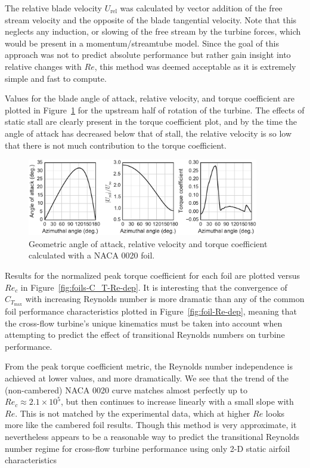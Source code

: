 \documentclass[energies,article,accept,moreauthors,pdftex,12pt,a4paper]{mdpi}
\begin{document}
The relative blade velocity $U_\mathrm{rel}$ was calculated by vector addition
of the free stream velocity and the opposite of the blade tangential velocity.
Note that this neglects any induction, or slowing of the free stream by the
turbine forces, which would be present in a momentum/streamtube model. Since the
goal of this approach was not to predict absolute performance but rather gain
insight into relative changes with $Re$, this method was deemed acceptable as it
is extremely simple and fast to compute.

Values for the blade angle of attack, relative velocity, and torque coefficient
are plotted in Figure~\ref{fig:blade-kinematics} for the upstream half of
rotation of the turbine. The effects of static stall are clearly present in the
torque coefficient plot, and by the time the angle of attack has decreased below
that of stall, the relative velocity is so low that there is not much
contribution to the torque coefficient.

\begin{figure}[ht!]
\centering
\includegraphics[width=0.9\textwidth]{figures/foil_kinematics_ct}
\caption{Geometric angle of attack, relative velocity and torque coefficient
calculated with a NACA 0020 foil.}
\label{fig:blade-kinematics}
\end{figure}

Results for the normalized peak torque coefficient for each foil are plotted
versus $Re_c$ in Figure~\ref{fig:foils-C_T-Re-dep}. It is interesting that the
convergence of $C_{T_\mathrm{max}}$ with increasing Reynolds number is more
dramatic than any of the common foil performance characteristics plotted in
Figure~\ref{fig:foil-Re-dep}, meaning that the cross-flow turbine's unique
kinematics must be taken into account when attempting to predict the effect of
transitional Reynolds numbers on turbine performance.

From the peak torque coefficient metric, the Reynolds number independence is
achieved at lower values, and more dramatically. We see that the trend of the
(non-cambered) NACA 0020 curve matches almost perfectly up to $Re_c \approx 2.1
\times 10^5$, but then continues to increase linearly with a small slope with
$Re$. This is not matched by the experimental data, which at higher $Re$ looks
more like the cambered foil results. Though this method is very approximate, it
nevertheless appears to be a reasonable way to predict the transitional Reynolds
number regime for cross-flow turbine performance using only 2-D static airfoil
characteristics
\end{document}
